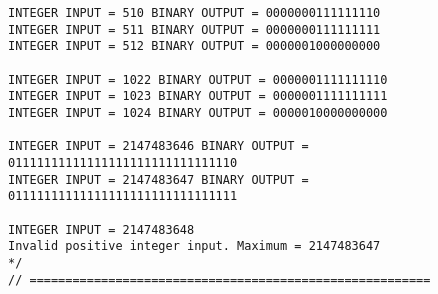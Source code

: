 \begin{lstlisting}[caption={App4-Converting-software-codes-to-binary-bits-pulses}, label=App4-Converting-software-codes-to-binary-bits-pulses]
INTEGER INPUT = 510 BINARY OUTPUT = 0000000111111110 
INTEGER INPUT = 511 BINARY OUTPUT = 0000000111111111 
INTEGER INPUT = 512 BINARY OUTPUT = 0000001000000000 

INTEGER INPUT = 1022 BINARY OUTPUT = 0000001111111110 
INTEGER INPUT = 1023 BINARY OUTPUT = 0000001111111111 
INTEGER INPUT = 1024 BINARY OUTPUT = 0000010000000000

INTEGER INPUT = 2147483646 BINARY OUTPUT = 01111111111111111111111111111110 
INTEGER INPUT = 2147483647 BINARY OUTPUT = 01111111111111111111111111111111 

INTEGER INPUT = 2147483648
Invalid positive integer input. Maximum = 2147483647
*/
// ========================================================
\end{lstlisting}
